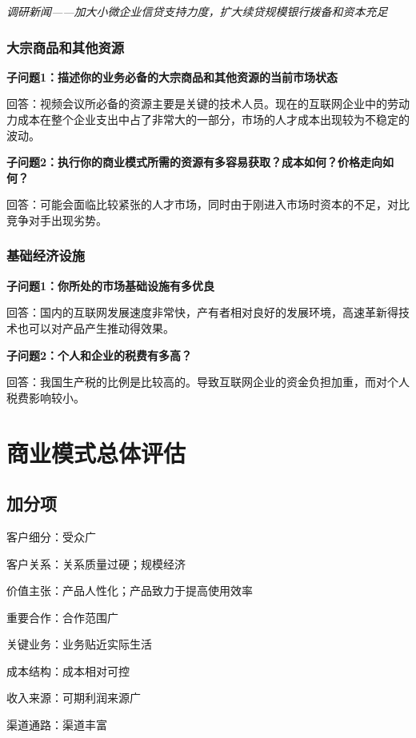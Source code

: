 \documentclass[a4paper,12pt]{article}
\begin{document}
    \textit{调研新闻——加⼤⼩微企业信贷⽀持⼒度，扩⼤续贷规模银⾏拨备和资本充⾜}

    \textit{}

    \subsubsection{大宗商品和其他资源}
    \textbf{子问题1：描述你的业务必备的大宗商品和其他资源的当前市场状态}

    回答：视频会议所必备的资源主要是关键的技术⼈员。现在的互联⽹企业中的劳动⼒成本在整个企业⽀出中占了⾮常⼤的⼀部分，市场的⼈才成本出现较为不稳定的波动。

    \textbf{子问题2：执行你的商业模式所需的资源有多容易获取？成本如何？价格走向如何？}

    回答：可能会⾯临⽐较紧张的⼈才市场，同时由于刚进⼊市场时资本的不⾜，对⽐竞争对⼿出现劣势。

    \subsubsection{基础经济设施}
    \textbf{子问题1：你所处的市场基础设施有多优良}

    回答：国内的互联⽹发展速度⾮常快，产有者相对良好的发展环境，⾼速⾰新得技术也可以对产品产⽣推动得效果。

    \textbf{子问题2：个人和企业的税费有多高？}

    回答：我国⽣产税的⽐例是⽐较⾼的。导致互联⽹企业的资⾦负担加重，⽽对个⼈税费影响较⼩。

    \section{商业模式总体评估}
    \subsection{加分项}
    客户细分：受众⼴
    
    客户关系：关系质量过硬；规模经济
    
    价值主张：产品⼈性化；产品致⼒于提⾼使⽤效率
    
    重要合作：合作范围⼴
    
    关键业务：业务贴近实际⽣活
    
    成本结构：成本相对可控
    
    收⼊来源：可期利润来源⼴
    
    渠道通路：渠道丰富
    
\end{document}
